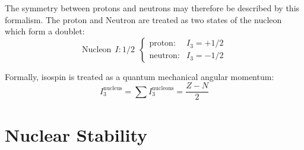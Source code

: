 \documentclass[10pt,a4paper]{article}
\begin{document}
The symmetry between protons and neutrons may therefore be described by this formalism. The proton and Neutron are treated as two states of the nucleon which form a doublet:
\begin{equation}
\text{Nucleon} \ \ I :1/2 \ \ \left\{
    \begin{array}{ll}
        \text{proton:} & I_3 = +1/2\\
        \text{neutron:} & I_3 = -1/2
    \end{array}\right.
\end{equation}

Formally, isospin is treated as a quantum mechanical angular momentum:
\begin{equation}
    I_3^{\text{nucleus}}= \sum  I_3^{\text{nucleons}} = \frac{Z-N}{2}
\end{equation}

\section{Nuclear Stability}
\end{document}
